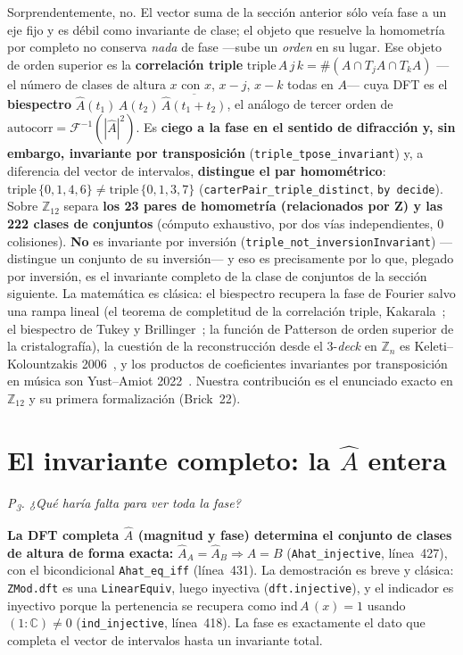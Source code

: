 \documentclass[11pt]{article}
\newcommand{\lean}[1]{\texttt{#1}}
\newcommand{\Ztwelve}{\mathbb{Z}_{12}}
\newcommand{\Zn}[1]{\mathbb{Z}_{#1}}
\newcommand{\Ahat}{\hat{A}}
\newcommand{\Fi}{\mathcal{F}^{-1}}
\newcommand{\question}[1]{\smallskip\noindent\textit{#1}\smallskip}
\begin{document}
\noindent Sorprendentemente, no. El vector suma de la sección anterior sólo veía fase a un eje fijo y es
débil como invariante de clase; el objeto que resuelve la homometría por completo no conserva \emph{nada}
de fase ---sube un \emph{orden} en su lugar. Ese objeto de orden superior es la \textbf{correlación triple}
$\mathrm{triple}\,A\,j\,k=\#(A\cap T_jA\cap T_kA)$ ---el número de clases de altura $x$ con $x$, $x-j$,
$x-k$ todas en $A$--- cuya DFT es el \textbf{biespectro} $\Ahat(t_1)\,\Ahat(t_2)\,\overline{\Ahat(t_1+t_2)}$,
el análogo de tercer orden de $\mathrm{autocorr}=\Fi(|\Ahat|^2)$. Es \textbf{ciego a la fase en el sentido
de difracción y, sin embargo, invariante por transposición} (\lean{triple\_tpose\_invariant}) y, a
diferencia del vector de intervalos, \textbf{distingue el par homométrico}:
$\mathrm{triple}\,\{0,1,4,6\}\ne\mathrm{triple}\,\{0,1,3,7\}$ (\lean{carterPair\_triple\_distinct},
\lean{by decide}). Sobre $\Ztwelve$ separa \textbf{los 23 pares de homometría (relacionados por Z) y las
222 clases de conjuntos} (cómputo exhaustivo, por dos vías independientes, $0$ colisiones). \textbf{No} es
invariante por inversión (\lean{triple\_not\_inversionInvariant}) ---distingue un conjunto de su inversión---
y eso es precisamente por lo que, plegado por inversión, es el invariante completo de la clase de conjuntos
de la sección siguiente. La matemática es clásica: el biespectro recupera la fase de Fourier salvo una
rampa lineal (el teorema de completitud de la correlación triple, Kakarala~\cite{Kakarala}; el biespectro
de Tukey y Brillinger~\cite{Brillinger}; la función de Patterson de orden superior de la cristalografía),
la cuestión de la reconstrucción desde el 3-\emph{deck} en $\Zn{n}$ es Keleti--Kolountzakis
2006~\cite{KK}, y los productos de coeficientes invariantes por transposición en música son Yust--Amiot
2022~\cite{YA}. Nuestra contribución es el enunciado exacto en $\Ztwelve$ y su primera formalización (Brick~22).

\section{El invariante completo: la \texorpdfstring{$\Ahat$}{A} entera}\label{sec:complete}

\question{P\textsubscript{3}. ¿Qué haría falta para ver \emph{toda} la fase?}

\textbf{La DFT completa $\Ahat$ (magnitud y fase) determina el conjunto de clases de altura de forma
exacta:} $\Ahat_A=\Ahat_B\Rightarrow A=B$ (\lean{Ahat\_injective}, línea~427), con el bicondicional
\lean{Ahat\_eq\_iff} (línea~431). La demostración es breve y clásica: \lean{ZMod.dft} es una
\lean{LinearEquiv}, luego inyectiva (\lean{dft.injective}), y el indicador es inyectivo porque la
pertenencia se recupera como $\mathrm{ind}\,A\,(x)=1$ usando $(1:\mathbb{C})\ne0$ (\lean{ind\_injective},
línea~418). La fase es exactamente el dato que completa el vector de intervalos hasta un invariante total.
\end{document}
